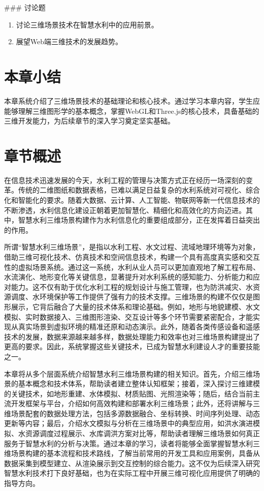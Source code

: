 \#\#\# 讨论题

\begin{enumerate}
\def\labelenumi{\arabic{enumi}.}
\setcounter{enumi}{6}
\tightlist
\item
  讨论三维场景技术在智慧水利中的应用前景。
\item
  展望Web端三维技术的发展趋势。
\end{enumerate}

\section{本章小结}

本章系统介绍了三维场景技术的基础理论和核心技术。通过学习本章内容，学生应能够理解三维图形学的基本概念，掌握WebGL和Three.js的核心技术，具备基础的三维开发能力，为后续章节的深入学习奠定坚实基础。

\section{章节概述}

在信息技术迅速发展的今天，水利工程的管理与决策方式正在经历一场深刻的变革。传统的二维图纸和数据表格，已难以满足日益复杂的水利系统对可视化、综合化和智能化的要求。随着大数据、云计算、人工智能、物联网等新一代信息技术的不断渗透，水利信息化建设正朝着更加智慧化、精细化和高效化的方向迈进。其中，智慧水利三维场景构建作为水利信息化的重要组成部分，正在发挥着日益突出的作用。

所谓``智慧水利三维场景''，是指以水利工程、水文过程、流域地理环境等为对象，借助三维可视化技术、仿真技术和空间信息技术，构建一个具有高度真实感和交互性的虚拟场景系统。通过这一系统，水利从业人员可以更加直观地了解工程布局、水流演化、地形变化等关键信息，显著提升对水利系统的感知能力、分析能力和应对能力。这不仅有助于优化水利工程的规划设计与施工管理，也为防洪减灾、水资源调度、水环境保护等工作提供了强有力的技术支撑。三维场景的构建不仅仅是图形展示，它背后融合了大量的技术体系和理论基础。例如，地形与地貌建模、水文模拟、实时数据接入、三维图形渲染、交互设计等多个环节需要紧密配合，才能实现从真实场景到虚拟环境的精准还原和动态演示。此外，随着各类传感设备和遥感技术的发展，数据来源越来越多样，数据处理能力和效率也对三维场景构建提出了更高的要求。因此，系统掌握这些关键技术，已成为智慧水利建设人才的重要技能之一。

本章将从多个层面系统介绍智慧水利三维场景构建的相关知识。首先，介绍三维场景的基本概念和技术体系，帮助读者建立整体认知框架；接着，深入探讨三维建模的关键技术，如地形重建、水体模拟、材质贴图、光照渲染等；随后，结合当前主流开发框架与平台，介绍如何高效构建和部署水利三维场景；此外，还将讲解与三维场景配套的数据处理方法，包括多源数据融合、坐标转换、时间序列处理、动态更新等内容；最后，介绍水文模拟与分析在三维场景中的典型应用，如洪水演进模拟、水资源调度过程展示、水库调洪方案对比等，帮助读者理解三维场景如何真正服务于智慧水利的分析与决策。通过本章的学习，读者将能够全面掌握智慧水利三维场景构建的基本流程和技术路线，了解当前常用的开发工具和应用案例，具备从数据采集到模型建立、从渲染展示到交互控制的综合能力。这不仅为后续深入研究智慧水利技术打下良好基础，也为在实际工程中开展三维可视化应用提供了明确的指导方向。

